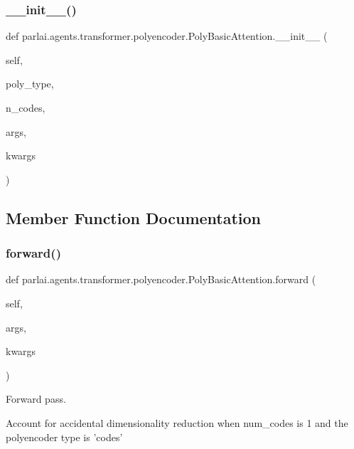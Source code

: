 \subsubsection{\texorpdfstring{\+\_\+\+\_\+init\+\_\+\+\_\+()}{\_\_init\_\_()}}
{\footnotesize\ttfamily def parlai.\+agents.\+transformer.\+polyencoder.\+Poly\+Basic\+Attention.\+\_\+\+\_\+init\+\_\+\+\_\+ (\begin{DoxyParamCaption}\item[{}]{self,  }\item[{}]{poly\+\_\+type,  }\item[{}]{n\+\_\+codes,  }\item[{}]{args,  }\item[{}]{kwargs }\end{DoxyParamCaption})}



\subsection{Member Function Documentation}
\mbox{\label{classparlai_1_1agents_1_1transformer_1_1polyencoder_1_1PolyBasicAttention_a6927374c5336d0111ab936c1fd2b62ff}} 
\subsubsection{\texorpdfstring{forward()}{forward()}}
{\footnotesize\ttfamily def parlai.\+agents.\+transformer.\+polyencoder.\+Poly\+Basic\+Attention.\+forward (\begin{DoxyParamCaption}\item[{}]{self,  }\item[{}]{args,  }\item[{}]{kwargs }\end{DoxyParamCaption})}

\begin{DoxyVerb}Forward pass.

Account for accidental dimensionality reduction when num_codes is 1 and the
polyencoder type is 'codes'
\end{DoxyVerb}
 

